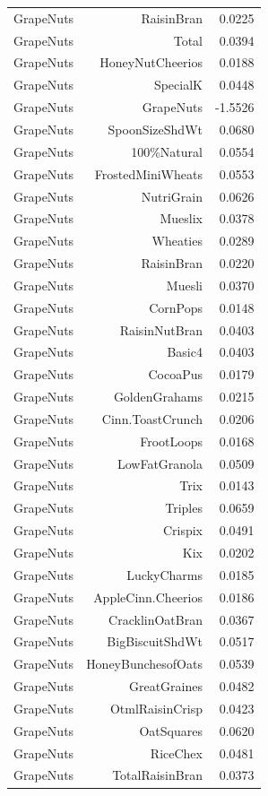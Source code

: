 \begin{longtable}{@{}lrr@{}}
GrapeNuts & RaisinBran & 0.0225 \\
GrapeNuts & Total & 0.0394 \\
GrapeNuts & HoneyNutCheerios & 0.0188 \\
GrapeNuts & SpecialK & 0.0448 \\
GrapeNuts & GrapeNuts & -1.5526 \\
GrapeNuts & SpoonSizeShdWt & 0.0680 \\
GrapeNuts & 100\%Natural & 0.0554 \\
GrapeNuts & FrostedMiniWheats & 0.0553 \\
GrapeNuts & NutriGrain & 0.0626 \\
GrapeNuts & Mueslix & 0.0378 \\
GrapeNuts & Wheaties & 0.0289 \\
GrapeNuts & RaisinBran & 0.0220 \\
GrapeNuts & Muesli & 0.0370 \\
GrapeNuts & CornPops & 0.0148 \\
GrapeNuts & RaisinNutBran & 0.0403 \\
GrapeNuts & Basic4 & 0.0403 \\
GrapeNuts & CocoaPus & 0.0179 \\
GrapeNuts & GoldenGrahams & 0.0215 \\
GrapeNuts & Cinn.ToastCrunch & 0.0206 \\
GrapeNuts & FrootLoops & 0.0168 \\
GrapeNuts & LowFatGranola & 0.0509 \\
GrapeNuts & Trix & 0.0143 \\
GrapeNuts & Triples & 0.0659 \\
GrapeNuts & Crispix & 0.0491 \\
GrapeNuts & Kix & 0.0202 \\
GrapeNuts & LuckyCharms & 0.0185 \\
GrapeNuts & AppleCinn.Cheerios & 0.0186 \\
GrapeNuts & CracklinOatBran & 0.0367 \\
GrapeNuts & BigBiscuitShdWt & 0.0517 \\
GrapeNuts & HoneyBunchesofOats & 0.0539 \\
GrapeNuts & GreatGraines & 0.0482 \\
GrapeNuts & OtmlRaisinCrisp & 0.0423 \\
GrapeNuts & OatSquares & 0.0620 \\
GrapeNuts & RiceChex & 0.0481 \\
GrapeNuts & TotalRaisinBran & 0.0373 \\

\end{longtable}
